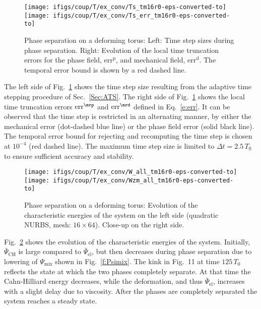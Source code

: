 \documentclass[11pt]{article}
\begin{document}
\begin{figure}[H]
\centering
\texttt{[image: ifigs/coup/T/ex\_conv/Ts\_tm16r0-eps-converted-to]}
\texttt{[image: ifigs/coup/T/ex\_conv/Ts\_err\_tm16r0-eps-converted-to]}
\caption{Phase separation on a deforming torus: Left: Time step sizes during phase separation. Right: Evolution of the local time truncation errors for the phase field, $\mathrm{err}^\mathrm{p}$, and mechanical field, $\mathrm{err}^\mathrm{d}$. The temporal error bound is shown by a red dashed line.}
\label{fig:t_ts1}
\end{figure}
The left side of Fig.~\ref{fig:t_ts1} shows the time step size resulting from the adaptive time stepping procedure of Sec.~\ref{Sec:ATS}. 
The right side of Fig.~\ref{fig:t_ts1} shows the local time truncation errors $\text{err}^\mrp$ and $\text{err}^\mrd$ defined in Eq.~\eqref{e:err}. 
It can be observed that the time step is restricted in an alternating manner, by either the mechanical error (dot-dashed blue line) or the phase field error (solid black line). 
The temporal error bound for rejecting and recomputing the time step is chosen at $10^{-4}$ (red dashed line). 
The maximum time step size is limited to $\Delta t = 2.5\,T_0$ to ensure sufficient accuracy and stability. 

\begin{figure}[H]
\centering
\texttt{[image: ifigs/coup/T/ex\_conv/W\_all\_tm16r0-eps-converted-to]}
\texttt{[image: ifigs/coup/T/ex\_conv/Wzm\_all\_tm16r0-eps-converted-to]}
\caption{Phase separation on a deforming torus: Evolution of the characteristic energies of the system on the left side (quadratic NURBS, mesh: $16\times 64$). Close-up on the right side.}
\label{fig:t_ene1}
\end{figure}
Fig.~\ref{fig:t_ene1} shows the evolution of the characteristic energies of the system. 
Initially, $\bar\Psi_\mathrm{CH}$ is large compared to $\bar\Psi_\mathrm{el}$, but then decreases during phase separation due to lowering of $\Psi_\mathrm{mix}$ shown in Fig.~\ref{f:Psimix}. The kink in Fig.~11 at time $125\,T_0$ reflects the state at which the two phases completely separate. At that time the Cahn-Hilliard energy decreases, while the deformation, and thus $\bar\Psi_\mathrm{el}$, increases with a slight delay due to viscosity.
After the phases are completely separated the system reaches a steady state.
\end{document}
